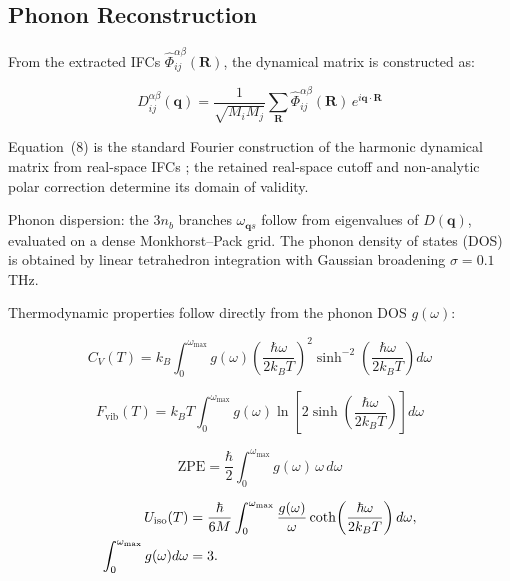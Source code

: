 \documentclass[aps,prb,reprint,amsmath,amssymb,floatfix]{revtex4-2}
\begin{document}
\subsection{Phonon Reconstruction}\label{phonon-reconstruction}

From the extracted IFCs \(\hat{\Phi}_{ij}^{\alpha\beta}(\mathbf{R})\),
the dynamical matrix is constructed as:

\begin{equation}
D_{ij}^{\alpha\beta}(\mathbf{q}) = \frac{1}{\sqrt{M_i M_j}} \sum_{\mathbf{R}} \hat{\Phi}_{ij}^{\alpha\beta}(\mathbf{R})\, e^{i\mathbf{q}\cdot\mathbf{R}}
\end{equation}

Equation~(8) is the standard Fourier construction of the harmonic dynamical
matrix from real-space IFCs \cite{ref13}; the retained real-space cutoff and
non-analytic polar correction determine its domain of validity.

Phonon dispersion: the \(3n_b\) branches \(\omega_{\mathbf{q}s}\) follow
from eigenvalues of \(D(\mathbf{q})\), evaluated on a dense
Monkhorst--Pack grid. The phonon density of states (DOS) is obtained by
linear tetrahedron integration with Gaussian broadening \(\sigma = 0.1\)
THz.

Thermodynamic properties follow directly from the phonon DOS
\(g(\omega)\):

\begin{equation}
C_V(T) = k_B \int_0^{\omega_\text{max}} g(\omega) \left(\frac{\hbar\omega}{2k_BT}\right)^2 \sinh^{-2}\!\left(\frac{\hbar\omega}{2k_BT}\right) d\omega
\end{equation}

\begin{equation}
F_\text{vib}(T) = k_B T \int_0^{\omega_\text{max}} g(\omega) \ln\!\left[2\sinh\!\left(\frac{\hbar\omega}{2k_BT}\right)\right] d\omega
\end{equation}

\begin{equation}
\text{ZPE} = \frac{\hbar}{2}\int_0^{\omega_\text{max}} g(\omega)\,\omega\, d\omega
\end{equation}

\begin{equation}
\begin{aligned}
U_{\rm iso}(T)
 &= \frac{\hbar}{6M}\int_0^{\omega_{\rm max}}
 \frac{g(\omega)}{\omega}
 \coth\!\left(\frac{\hbar\omega}{2k_BT}\right)d\omega,\\
\int_0^{\omega_{\rm max}}g(\omega)d\omega&=3 .
\end{aligned}
\end{equation}
\end{document}
